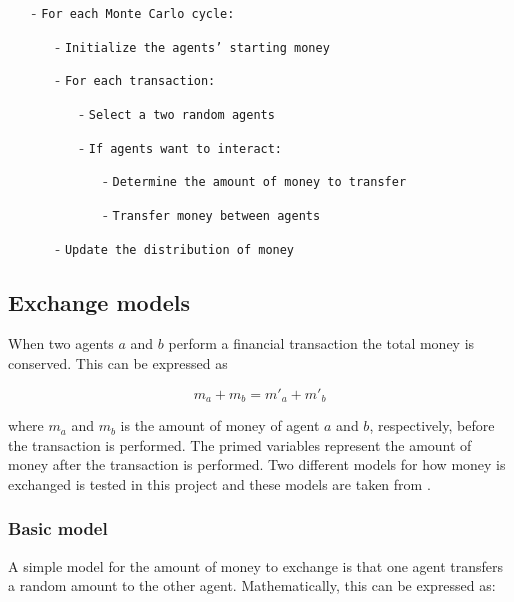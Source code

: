 \documentclass{article}
\begin{document}
\begin{framed}
\begin{itemize}
\item[-] \texttt{For each Monte Carlo cycle:}
\begin{itemize}
\item[-] \texttt{Initialize the agents' starting money}
\item[-] \texttt{For each transaction:}
\begin{itemize}
\item[-] \texttt{Select a two random agents} 
\item[-] \texttt{If agents want to interact:}
\begin{itemize}
\item[-] \texttt{Determine the amount of money to transfer}
\item[-] \texttt{Transfer money between agents}
\end{itemize}
\end{itemize}
\item[-] \texttt{Update the distribution of money}
\end{itemize}
\end{itemize}
\end{framed} 

\subsection{Exchange models}
\label{subsec:exchange}

When two agents $a$ and $b$ perform a financial transaction the total money is conserved. This can be expressed as

\begin{equation}
m_a + m_b = m'_a + m'_b 
\end{equation} 

\noindent where $m_a$ and $m_b$ is the amount of money of agent $a$ and $b$, respectively, before the transaction is performed. The primed variables represent the amount of money after the transaction is performed. Two different models for how money is exchanged is tested in this project and these models are taken from \cite{gibbs}.

\subsubsection{Basic model}
\label{subsec:without_save}
A simple model for the amount of money to exchange is that one agent transfers a random amount to the other agent. Mathematically, this can be expressed as:
\end{document}
